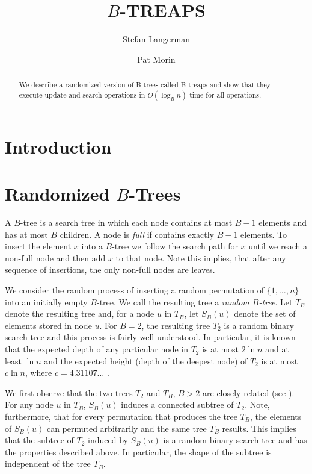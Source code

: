 \documentclass[lotsofwhite,charterfonts]{patmorin}
\title{\MakeUppercase{$B$-Treaps}}
\author{Stefan Langerman \and Pat Morin}
\date{}
\begin{document}
\maketitle

\begin{abstract}
We describe a randomized version of B-trees called B-treaps and show
that they execute update and search operations in $O(\log_B n)$ time
for all operations.
\end{abstract}

\section{Introduction}

\section{Randomized $B$-Trees}

A $B$-tree is a search tree in which each node contains at most $B-1$
elements and has at most $B$ children.   A node is \emph{full} if
contains exactly $B-1$ elements.  To insert the element $x$ into a
$B$-tree we follow the search path for $x$ until we reach a non-full
node and then add $x$ to that node.  Note this implies, that after any
sequence of insertions, the only non-full nodes are leaves.  

We consider the random process of inserting a random permutation of
$\{1,\ldots,n\}$ into an initially empty $B$-tree.  We call the
resulting tree a \emph{random $B$-tree}.  Let $T_B$ denote the
resulting tree and, for a node $u$ in $T_B$, let $S_B(u)$ denote the
set of elements stored in node $u$.  For $B=2$, the resulting tree
$T_2$ is a random binary search tree and this process is fairly well
understood.  In particular, it is known that the expected depth of any
particular node in $T_2$ is at most $2\ln n$ and at least $\ln n$
\cite{X} and the expected height (depth of the deepest node) of $T_2$
is at most $c\ln n$, where $c=4.31107\ldots$ \cite{X}.  

We first observe that the two trees $T_2$ and $T_B$, $B>2$ are closely
related (see ).  For any node $u$ in $T_B$, $S_B(u)$
induces a connected subtree of $T_2$.  Note, furthermore, that for
every permutation that produces the tree $T_B$, the elements of
$S_B(u)$ can permuted arbitrarily and the same tree $T_B$ results.
This implies that the subtree of $T_2$ induced by $S_B(u)$ is a random
binary search tree and has the properties described above.  In
particular, the shape of the subtree is independent of the tree $T_B$.
\end{document}
